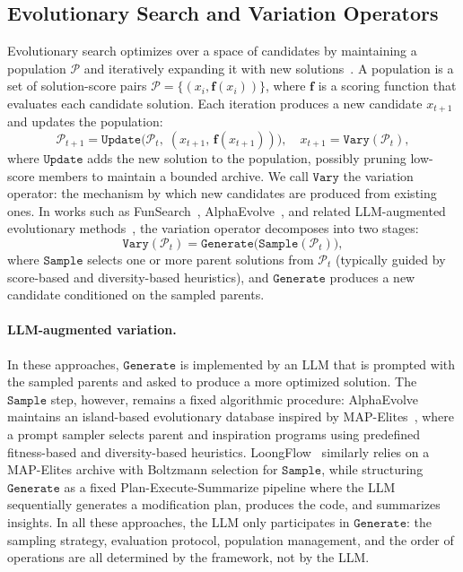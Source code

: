 \documentclass{article}
\begin{document}
\subsection{Evolutionary Search and Variation Operators}
\label{sec:background_evo}

Evolutionary search optimizes over a space of candidates by maintaining a population $\mathcal{P}$ and iteratively expanding it with new solutions~\citep{back1997evolutionary}.
A population is a set of solution-score pairs $\mathcal{P} = \{(x_i, \mathbf{f}(x_i))\}$, where $\mathbf{f}$ is a scoring function that evaluates each candidate solution.
Each iteration produces a new candidate $x_{t+1}$ and updates the population:
\begin{equation}
\label{eq:evo_loop}
\mathcal{P}_{t+1} = \texttt{Update}\!\big(\mathcal{P}_t,\; (x_{t+1},\, \mathbf{f}(x_{t+1}))\big), \quad x_{t+1} = \texttt{Vary}(\mathcal{P}_t),
\end{equation}
where $\texttt{Update}$ adds the new solution to the population, possibly pruning low-score members to maintain a bounded archive.
We call $\texttt{Vary}$ the variation operator: the mechanism by which new candidates are produced from existing ones.
In works such as FunSearch~\citep{funsearch2024}, AlphaEvolve~\citep{alphaevolve2025}, and related LLM-augmented evolutionary methods~\citep{lehman2022elm, ye2024reevo, chen2023evoprompting}, the variation operator decomposes into two stages:
\begin{equation}
\label{eq:classical_vary}
\texttt{Vary}(\mathcal{P}_t) = \texttt{Generate}\!\big(\texttt{Sample}(\mathcal{P}_t)\big),
\end{equation}
where $\texttt{Sample}$ selects one or more parent solutions from $\mathcal{P}_t$ (typically guided by score-based and diversity-based heuristics), and $\texttt{Generate}$ produces a new candidate conditioned on the sampled parents.

\paragraph{LLM-augmented variation.}
In these approaches, $\texttt{Generate}$ is implemented by an LLM that is prompted with the sampled parents and asked to produce a more optimized solution.
The $\texttt{Sample}$ step, however, remains a fixed algorithmic procedure: AlphaEvolve maintains an island-based evolutionary database inspired by MAP-Elites~\citep{mouret2015mapelites}, where a prompt sampler selects parent and inspiration programs using predefined fitness-based and diversity-based heuristics.
LoongFlow~\citep{wan2025loongflow} similarly relies on a MAP-Elites archive with Boltzmann selection for $\texttt{Sample}$, while structuring $\texttt{Generate}$ as a fixed Plan-Execute-Summarize pipeline where the LLM sequentially generates a modification plan, produces the code, and summarizes insights.
In all these approaches, the LLM only participates in $\texttt{Generate}$: the sampling strategy, evaluation protocol, population management, and the order of operations are all determined by the framework, not by the LLM.
\end{document}

